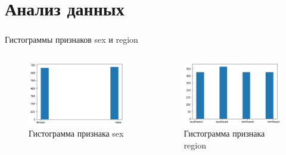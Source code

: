 \documentclass[c]{beamer}  %
\begin{document}
	\section{Анализ данных}
	\begin{frame}
		\frametitle{\insertsection}

		\begin{block}{Гистограммы признаков sex и region}
			\begin{columns}[onlytextwidth,T]
				\begin{figure}[H]
					\centering
					\includegraphics[scale=0.35]{sex_hist.png}
					\caption{Гистограмма признака sex}
					\label{img:sex_hist}
				\end{figure}
				\begin{figure}[H]
					\centering
					\includegraphics[scale=0.35]{region_hist.png}
					\caption{Гистограмма признака region}
					\label{img:region_hist}
				\end{figure}
			\end{columns}
		\end{block}
	\end{frame}
\end{document}
